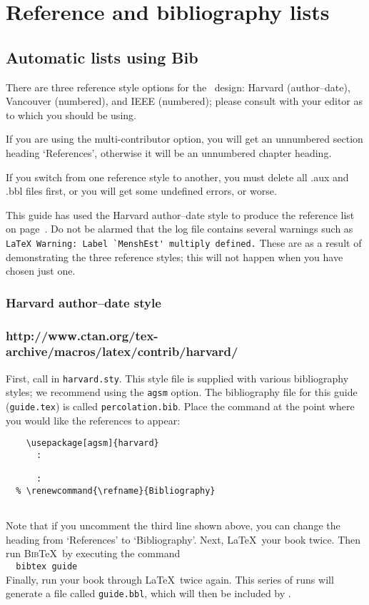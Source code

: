 
\chapter{Reference and bibliography lists}

\section{Automatic lists using Bib\upshape{\TeX}}
There are three reference style options for the \cambridge\ design: Harvard (author--date), Vancouver (numbered), and IEEE (numbered); please consult with your editor as to which you should be using.

If you are using the multi-contributor option, you will get an unnumbered section heading `References', otherwise it will be an unnumbered chapter heading.

If you switch from one reference style to another, you must delete all .aux and .bbl files first, or you will get some undefined errors, or worse.

This guide has used the Harvard author--date style to produce the reference list on page~\pageref{refs}. Do not be alarmed that the log file contains several warnings such as\linebreak
\verb"LaTeX Warning: Label `MenshEst' multiply defined." These are as a result of demonstrating the three reference styles; this will not happen when you have chosen just one.

\subsection{Harvard author--date style}

\subsection*{http://www.ctan.org/tex-archive/macros/latex/contrib/harvard/}

First, call in \texttt{harvard.sty}. This style file is supplied with various bibliography styles; we recommend using the \texttt{agsm} option. The bibliography file for this guide (\texttt{\cambridge guide.tex}) is called \texttt{percolation.bib}. Place the \verb"" command at the point where you would like the references to appear:
%
\begin{verbatim}
    \usepackage[agsm]{harvard}
      :
    
      :
  % \renewcommand{\refname}{Bibliography}
    
\end{verbatim}
%
Note that if you uncomment the third line shown above, you can change the heading from `References' to `Bibliography'. Next, \LaTeX\ your book twice. Then run \textsc{Bib}\TeX\ by executing the command\\[0.5\baselineskip]
\verb"  bibtex "\texttt{\cambridge guide}\\[0.5\baselineskip]
Finally, run your book through \LaTeX\ twice again. This series of runs will generate a file called \texttt{\cambridge guide.bbl}, which will then be included by \verb"".

